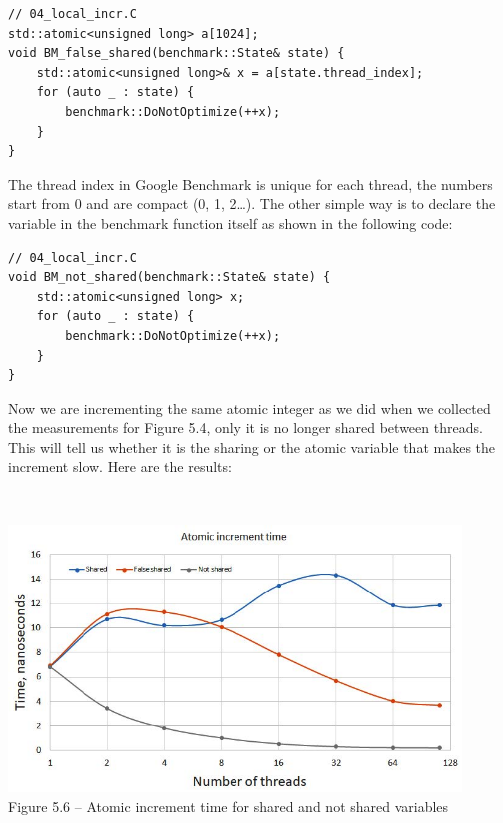 \begin{lstlisting}[style=styleCXX]
// 04_local_incr.C
std::atomic<unsigned long> a[1024];
void BM_false_shared(benchmark::State& state) {
	std::atomic<unsigned long>& x = a[state.thread_index];
	for (auto _ : state) {
		benchmark::DoNotOptimize(++x);
	}
}
\end{lstlisting}

The thread index in Google Benchmark is unique for each thread, the numbers start from 0 and are compact (0, 1, 2…). The other simple way is to declare the variable in the benchmark function itself as shown in the following code:

\begin{lstlisting}[style=styleCXX]
// 04_local_incr.C
void BM_not_shared(benchmark::State& state) {
	std::atomic<unsigned long> x;
	for (auto _ : state) {
		benchmark::DoNotOptimize(++x);
	}
}
\end{lstlisting}

Now we are incrementing the same atomic integer as we did when we collected the measurements for Figure 5.4, only it is no longer shared between threads. This will tell us whether it is the sharing or the atomic variable that makes the increment slow. Here are the results:

\hspace*{\fill} \\ %
\begin{center}
\includegraphics[width=0.9\textwidth]{content/1/chapter5/images/6.jpg}\\
Figure 5.6 – Atomic increment time for shared and not shared variables
\end{center}

